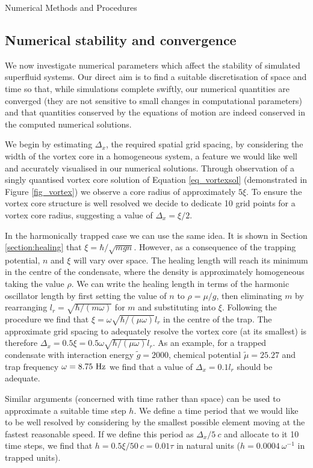 \begin{chapter}{\label{cha:numerics}Numerical Methods and Procedures}
	\subsection{\label{section:numericalParams} Numerical stability and convergence}
	We now investigate numerical parameters which affect the stability of simulated superfluid systems. Our direct aim is to find a suitable discretisation of space and time so that, while simulations complete swiftly, our numerical quantities are converged (they are not sensitive to small changes in computational parameters) and that quantities conserved by the equations of motion are indeed conserved in the computed numerical solutions.

	We begin by estimating $\Delta_x$, the required spatial grid spacing, by considering the width of the vortex core in a homogeneous system, a feature we would like well and accurately visualised in our numerical solutions. Through observation of a singly quantised vortex core solution of Equation \ref{eq_vortexsol} (demonstrated in Figure \ref{fig_vortex}) we observe a core radius of approximately $5\xi$. To ensure the vortex core structure is well resolved we decide to dedicate 10 grid points for a vortex core radius, suggesting a value of $\Delta_x = \xi/2$.

	In the harmonically trapped case we can use the same idea. It is shown in Section \ref{section:healing} that $\xi = \hbar/\sqrt{mgn}$. However, as a consequence of the trapping potential, $n$ and $\xi$ will vary over space. The healing length will reach its minimum in the centre of the condensate, where the density is approximately homogeneous taking the value $\rho$. We can write the healing length in terms of the harmonic oscillator length by first setting the value of $n$ to $\rho = \mu/g$, then eliminating $m$ by rearranging $l_r = \sqrt{\hbar/(m\omega)}$ for $m$ and substituting into $\xi$. Following the procedure we find that $\xi = \omega\sqrt{\hbar/(\mu\omega)}l_r$ in the centre of the trap. The approximate grid spacing to adequately resolve the vortex core (at its smallest) is therefore $\Delta_x = 0.5\xi = 0.5\omega \sqrt{\hbar/(\mu \omega)} l_r$. As an example, for a trapped condensate with interaction energy $\tilde{g}=2000$, chemical potential $\tilde{\mu}=25.27$ and trap frequency $\omega=8.75~{\rm Hz}$ we find that a value of $\Delta_x=0.1l_r$ should be adequate.

	Similar arguments (concerned with time rather than space) can be used to approximate a suitable time step $h$. We define a time period that we would like to be well resolved by considering by the smallest possible element moving at the fastest reasonable speed. If we define this period as $\Delta_x / 5~c$ and allocate to it 10 time steps, we find that $h = 0.5\xi/50~c = 0.01\tau$ in natural units ($h=0.0004~\omega^{-1}$ in trapped units).


\end{chapter}
